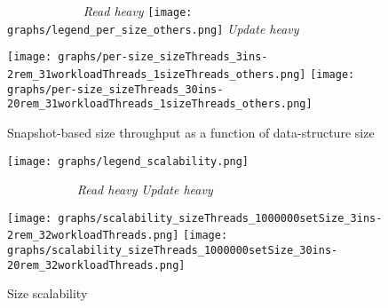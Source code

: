 \documentclass{article}
\begin{document}
\begin{figure*}
  \caption{Snapshot-based size throughput as a function of data-structure size}
  \centering
  \medskip
  \textit{\ \ \ \ \ \ \ \ \ \ \ \ Read heavy}\hfill
  \texttt{[image: graphs/legend\_per\_size\_others.png]}\hfill
  \textit{Update heavy\ \ \ \ }\par
  \medskip
  \texttt{[image: graphs/per-size\_sizeThreads\_3ins-2rem\_31workloadThreads\_1sizeThreads\_others.png]}\hfill
  \texttt{[image: graphs/per-size\_sizeThreads\_30ins-20rem\_31workloadThreads\_1sizeThreads\_others.png]}
  \label{fig:per-size-snapshot}
\end{figure*}

\begin{figure*}[ht]
  \caption{Size scalability}
  \centering
  \medskip
  \hfill\texttt{[image: graphs/legend\_scalability.png]}\hspace*{1.5mm}\par
  \textit{\ \ \ \ \ \ \ \ \ \ \ Read heavy}\hfill
  \textit{Update heavy\ \ \ \ }\par
  \medskip
  \texttt{[image: graphs/scalability\_sizeThreads\_1000000setSize\_3ins-2rem\_32workloadThreads.png]}\hfill
  \texttt{[image: graphs/scalability\_sizeThreads\_1000000setSize\_30ins-20rem\_32workloadThreads.png]}
  \label{fig:scalability}
\end{figure*}
\end{document}
